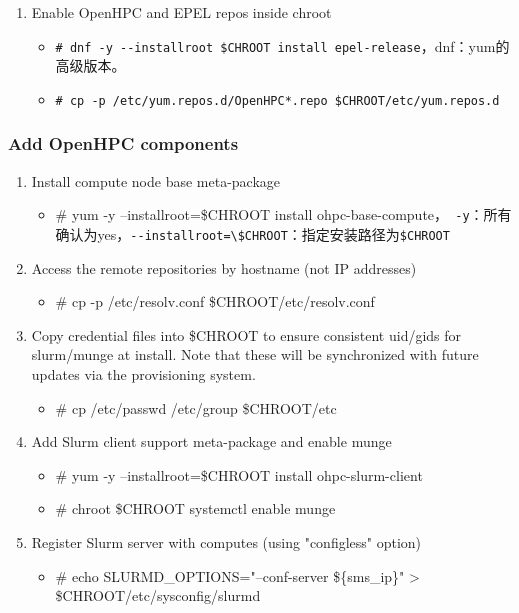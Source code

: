 {\begin{enumerate}
\item Enable OpenHPC and EPEL repos inside chroot
\begin{itemize}
\item \verb|# dnf -y --installroot $CHROOT install epel-release|，dnf：yum的高级版本。
\item \verb|# cp -p /etc/yum.repos.d/OpenHPC*.repo $CHROOT/etc/yum.repos.d|
\end{itemize}
\end{enumerate}


\subsubsection{Add OpenHPC components}
\begin{enumerate}
\item Install compute node base meta-package
\begin{itemize}
\item \# yum -y --installroot=\$CHROOT install ohpc-base-compute，\verb| -y|：所有确认为yes，\verb|--installroot=\$CHROOT|：指定安装路径为\verb|$CHROOT|
\end{itemize}

\item Access the remote repositories by hostname (not IP addresses)
\begin{itemize}
\item \# cp -p /etc/resolv.conf \$CHROOT/etc/resolv.conf
\end{itemize}

\item Copy credential files into \$CHROOT to ensure consistent uid/gids for slurm/munge at install. Note that these will be synchronized with future updates via the provisioning system.
\begin{itemize}
\item \# cp /etc/passwd /etc/group \$CHROOT/etc
\end{itemize}

\item Add Slurm client support meta-package and enable munge
\begin{itemize}
\item \# yum -y --installroot=\$CHROOT install ohpc-slurm-client
\item \# chroot \$CHROOT systemctl enable munge
\end{itemize}

\item Register Slurm server with computes (using "configless" option)
\begin{itemize}
\item \# echo SLURMD\_OPTIONS="--conf-server \$\{sms\_ip\}" > \$CHROOT/etc/sysconfig/slurmd
\end{itemize}


\end{enumerate}}
